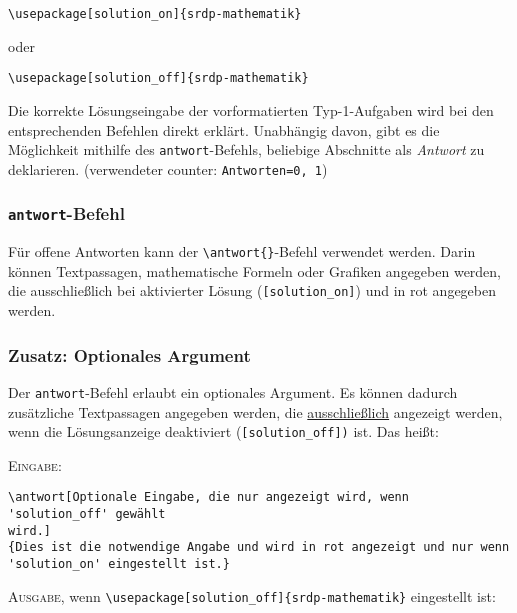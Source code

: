 \documentclass[a4paper,12pt]{article}
\begin{document}
\begin{verbatim}
\usepackage[solution_on]{srdp-mathematik}
\end{verbatim}

oder

\begin{verbatim}
\usepackage[solution_off]{srdp-mathematik}
\end{verbatim}


Die korrekte Lösungseingabe der vorformatierten Typ-1-Aufgaben wird bei den entsprechenden Befehlen direkt erklärt. Unabhängig davon, gibt es die Möglichkeit mithilfe des \texttt{antwort}-Befehls, beliebige Abschnitte als \textit{Antwort} zu deklarieren. (verwendeter counter: \texttt{Antworten=0, 1})   


\subsubsection{\texttt{antwort}-Befehl}
Für offene Antworten kann der \texttt{\textbackslash antwort\{\}}-Befehl verwendet werden. Darin können Textpassagen, mathematische Formeln oder Grafiken angegeben werden, die ausschließlich bei aktivierter Lösung (\texttt{[solution\_on]}) und in \textcolor[rgb]{1,0,0}{rot} angegeben werden. \leer


\subsubsection{Zusatz: Optionales Argument}

Der \texttt{antwort}-Befehl erlaubt ein optionales Argument. Es können dadurch zusätzliche Textpassagen angegeben werden, die \underline{ausschließlich} angezeigt werden, wenn die Lösungsanzeige deaktiviert (\texttt{[solution\_off])} ist. Das heißt: \leer

\textsc{Eingabe:}
\begin{verbatim}
\antwort[Optionale Eingabe, die nur angezeigt wird, wenn 'solution_off' gewählt 
wird.]
{Dies ist die notwendige Angabe und wird in rot angezeigt und nur wenn 
'solution_on' eingestellt ist.}  
\end{verbatim}


\textsc{Ausgabe}, wenn \texttt{\textbackslash usepackage[solution\_off]\{srdp-mathematik\}} eingestellt ist: \\

\setcounter{Antworten}{0}
\leer
\end{document}
